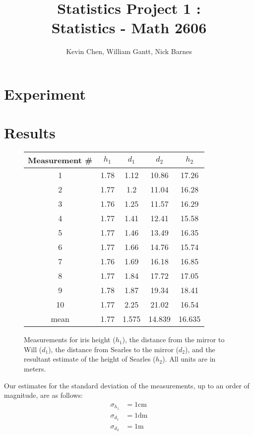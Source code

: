 \documentclass[11pt]{article}
\title{Statistics Project 1 : \\ Statistics - Math 2606}
\author{Kevin Chen, William Gantt, Nick Barnes}
\date{}
\begin{document}
\maketitle
\section{Experiment}
\section{Results}
\begin{figure}
\centering
\begin{tabular}{ccccc}
\toprule
Measurement \# & $h_1$ & $d_1$ & $d_2$ & $h_2$ \\
\midrule
1 & 1.78 & 1.12 & 10.86 & 17.26 \\
2 & 1.77 & 1.2 & 11.04 & 16.28 \\
3 & 1.76 & 1.25 & 11.57 & 16.29 \\
4 & 1.77 & 1.41 & 12.41 & 15.58 \\
5 & 1.77 & 1.46 & 13.49 & 16.35 \\
6 & 1.77 & 1.66 & 14.76 & 15.74 \\
7 & 1.76 & 1.69 & 16.18 & 16.85 \\
8 & 1.77 & 1.84 & 17.72 & 17.05 \\
9 & 1.78 & 1.87 & 19.34 & 18.41 \\
10 & 1.77 & 2.25 & 21.02 & 16.54 \\
\midrule
mean & 1.77 & 1.575 & 14.839 & 16.635 \\
\bottomrule
\end{tabular}
\caption{Measurements for iris height ($h_1$), the distance from the mirror to Will ($d_1$), the distance from Searles to the mirror ($d_2$), and the resultant estimate of the height of Searles ($h_2$). All units are in meters.}
\end{figure}
Our estimates for the standard deviation of the measurements, up to an order of magnitude, are as follows:
\begin{align*}
\sigma_{h_1} &= 1\text{cm} \\
\sigma_{d_1} &= 1\text{dm} \\
\sigma_{d_2} &= 1\text{m}
\end{align*}
\end{document}
